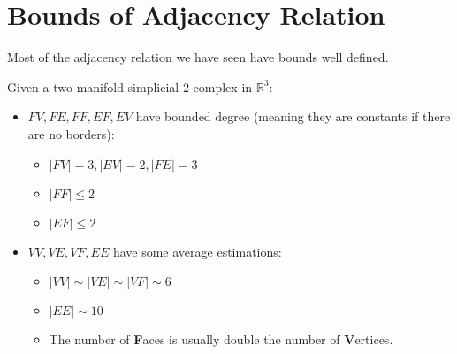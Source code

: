 \section{Bounds of Adjacency Relation}
Most of the adjacency relation we have seen have bounds well defined. \par
Given a two manifold simplicial 2-complex in $\mathbb{R}^{3}$:

\begin{itemize}
    \item $FV, FE, FF, EF, EV$ have bounded degree (meaning they are constants if there are no borders):
        \begin{itemize}
            \item $|FV| = 3, |EV| = 2, |FE| = 3$
            \item $|FF| \leq 2$
            \item $|EF| \leq 2$
        \end{itemize}
    \item $VV, VE, VF, EE$ have some average estimations:
        \begin{itemize}
            \item $|VV| \sim |VE| \sim |VF| \sim 6$
            \item $|EE| \sim 10$
            \item The number of \textbf{F}aces is usually double the number of \textbf{V}ertices.
        \end{itemize}
\end{itemize}

